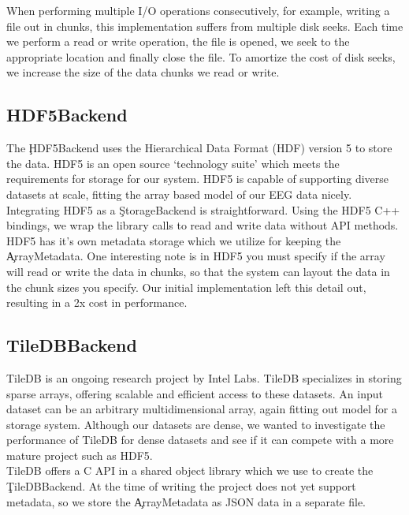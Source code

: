 When performing multiple I/O operations consecutively, for example, writing a
file out in chunks, this implementation suffers from multiple disk seeks. Each
time we perform a read or write operation, the file is opened, we seek to the
appropriate location and finally close the file. To amortize the cost of disk
seeks, we increase the size of the data chunks we read or write.

\subsection{HDF5Backend}\label{storage-ch:implementation-hdf5}

The \c{HDF5Backend} uses the Hierarchical Data Format (HDF) version 5
\cite{hdf5} to store the data. HDF5 is an open source `technology suite' which
meets the requirements for storage for our system. HDF5 is capable of
supporting diverse datasets at scale, fitting the array based model of our
EEG data nicely. \\

Integrating HDF5 as a \c{StorageBackend} is straightforward. Using the HDF5 C++
bindings, we wrap the library calls to read and write data without API methods.
HDF5 has it's own metadata storage which we utilize for keeping the
\c{ArrayMetadata}. One interesting note is in HDF5 you must specify if the
array will read or write the data in chunks, so that the system can layout the
data in the chunk sizes you specify. Our initial implementation left this
detail out, resulting in a 2x cost in performance.

\subsection{TileDBBackend}\label{storage-ch:implementation-tiledb}

TileDB \cite{tiledb} is an ongoing research project by Intel Labs. TileDB
specializes in storing sparse arrays, offering scalable and efficient access to
these datasets. An input dataset can be an arbitrary multidimensional array,
again fitting out model for a storage system. Although our datasets are dense,
we wanted to investigate the performance of TileDB for dense datasets and see
if it can compete with a more mature project such as HDF5.\\

TileDB offers a C API in a shared object library which we use to create the
\c{TileDBBackend}. At the time of writing the project does not yet support
metadata, so we store the \c{ArrayMetadata} as JSON data in a separate file. \\

